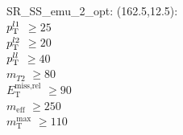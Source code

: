 SR\_SS\_emu\_2\_opt: (162.5,12.5): \\
$p_{\text{T}}^{l1}$ $\geq 25$ \\
$p_{\text{T}}^{l2}$ $\geq 20$ \\
$p_{\text{T}}^{ll}$ $\geq 40$ \\
$m_{T2}$ $\geq 80$ \\
$E_{\text{T}}^{\text{miss,rel}}$ $\geq 90$ \\
$m_{\text{eff}}$ $\geq 250$ \\
$m_{\text{T}}^{\text{max}}$ $\geq 110$ \\
